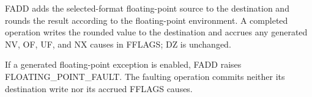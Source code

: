 FADD adds the selected-format floating-point source to the destination and
rounds the result according to the floating-point environment. A completed
operation writes the rounded value to the destination and accrues any generated
NV, OF, UF, and NX causes in FFLAGS; DZ is unchanged.

If a generated floating-point exception is enabled, FADD raises
FLOATING\_POINT\_FAULT. The faulting operation commits neither its destination
write nor its accrued FFLAGS causes.
